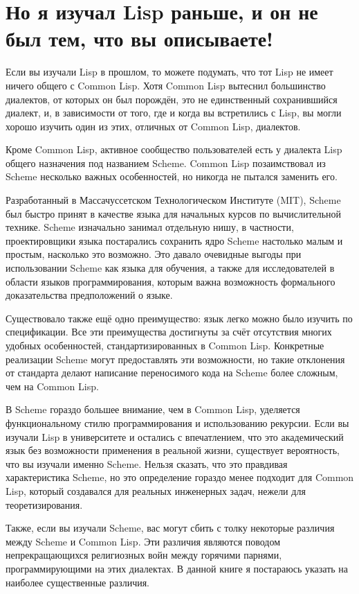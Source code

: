 \section{Но я изучал Lisp раньше, и он не был тем, что вы описываете!}

Если вы изучали Lisp в прошлом, то можете подумать, что тот Lisp не имеет ничего общего с
Common Lisp. Хотя Common Lisp вытеснил большинство диалектов, от которых он был порождён,
это не единственный сохранившийся диалект, и, в зависимости от того, где и когда вы
встретились с Lisp, вы могли хорошо изучить один из этих, отличных от Common Lisp,
диалектов.

Кроме Common Lisp, активное сообщество пользователей есть у диалекта Lisp общего
назначения под названием Scheme. Common Lisp позаимствовал из Scheme несколько важных
особенностей, но никогда не пытался заменить его.

Разработанный в Массачуссетском Технологическом Институте (MIT), Scheme был быстро принят
в качестве языка для начальных курсов по вычислительной технике. Scheme изначально занимал
отдельную нишу, в частности, проектировщики языка постарались сохранить ядро Scheme
настолько малым и простым, насколько это возможно. Это давало очевидные выгоды при
использовании Scheme как языка для обучения, а также для исследователей в области языков
программирования, которым важна возможность формального доказательства предположений о
языке.

Существовало также ещё одно преимущество: язык легко можно было изучить по
спецификации. Все эти преимущества достигнуты за счёт отсутствия многих удобных
особенностей, стандартизированных в Common Lisp. Конкретные реализации Scheme могут
предоставлять эти возможности, но такие отклонения от стандарта делают написание
переносимого кода на Scheme более сложным, чем на Common Lisp.

В Scheme гораздо большее внимание, чем в Common Lisp, уделяется функциональному стилю
программирования и использованию рекурсии. Если вы изучали Lisp в университете и остались
с впечатлением, что это академический язык без возможности применения в реальной жизни,
существует вероятность, что вы изучали именно Scheme. Нельзя сказать, что это правдивая
характеристика Scheme, но это определение гораздо менее подходит для Common Lisp, который
создавался для реальных инженерных задач, нежели для теоретизирования.

Также, если вы изучали Scheme, вас могут сбить с толку некоторые различия между Scheme и
Common Lisp. Эти различия являются поводом непрекращающихся религиозных войн между
горячими парнями, программирующими на этих диалектах. В данной книге я постараюсь указать
на наиболее существенные различия.

